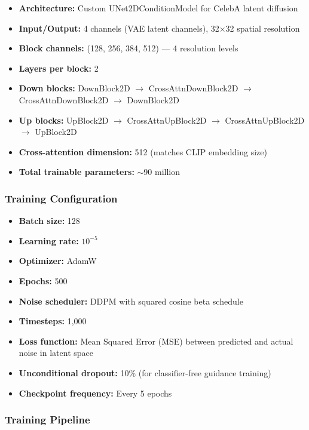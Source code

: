 \begin{itemize}
    \item \textbf{Architecture:} Custom UNet2DConditionModel for CelebA latent diffusion
    \item \textbf{Input/Output:} 4 channels (VAE latent channels), 32$\times$32 spatial resolution
    \item \textbf{Block channels:} (128, 256, 384, 512) --- 4 resolution levels
    \item \textbf{Layers per block:} 2
    \item \textbf{Down blocks:} DownBlock2D $\rightarrow$ CrossAttnDownBlock2D $\rightarrow$ CrossAttnDownBlock2D $\rightarrow$ DownBlock2D
    \item \textbf{Up blocks:} UpBlock2D $\rightarrow$ CrossAttnUpBlock2D $\rightarrow$ CrossAttnUpBlock2D $\rightarrow$ UpBlock2D
    \item \textbf{Cross-attention dimension:} 512 (matches CLIP embedding size)
    \item \textbf{Total trainable parameters:} $\sim$90 million
\end{itemize}

\subsubsection{Training Configuration}

\begin{itemize}
    \item \textbf{Batch size:} 128
    \item \textbf{Learning rate:} $10^{-5}$
    \item \textbf{Optimizer:} AdamW
    \item \textbf{Epochs:} 500
    \item \textbf{Noise scheduler:} DDPM with squared cosine beta schedule
    \item \textbf{Timesteps:} 1,000
    \item \textbf{Loss function:} Mean Squared Error (MSE) between predicted and actual noise in latent space
    \item \textbf{Unconditional dropout:} 10\% (for classifier-free guidance training)
    \item \textbf{Checkpoint frequency:} Every 5 epochs
\end{itemize}

\subsubsection{Training Pipeline}

